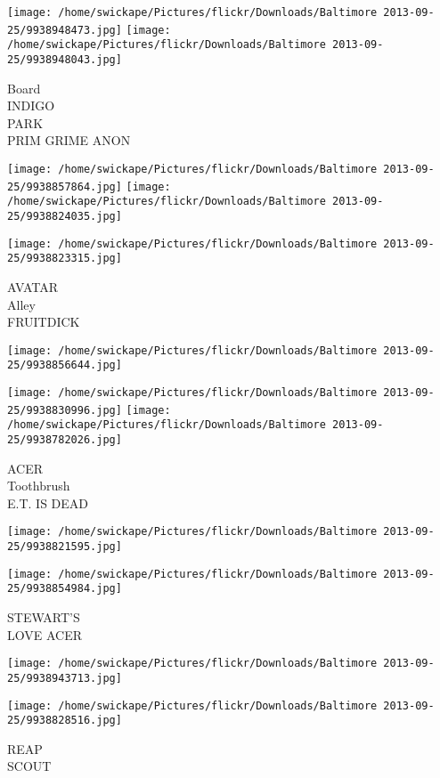 \documentclass[10pt,letterpaper]{article}
\begin{document}
\texttt{[image: /home/swickape/Pictures/flickr/Downloads/Baltimore 2013-09-25/9938948473.jpg]}
\texttt{[image: /home/swickape/Pictures/flickr/Downloads/Baltimore 2013-09-25/9938948043.jpg]}

Board\\
INDIGO\\
PARK\\
PRIM GRIME ANON
\pagebreak

\texttt{[image: /home/swickape/Pictures/flickr/Downloads/Baltimore 2013-09-25/9938857864.jpg]}
\texttt{[image: /home/swickape/Pictures/flickr/Downloads/Baltimore 2013-09-25/9938824035.jpg]}

\vspace{0.25in}
\texttt{[image: /home/swickape/Pictures/flickr/Downloads/Baltimore 2013-09-25/9938823315.jpg]}

AVATAR\\
Alley\\
FRUITDICK
\pagebreak

\texttt{[image: /home/swickape/Pictures/flickr/Downloads/Baltimore 2013-09-25/9938856644.jpg]}

\vspace{0.25in}
\texttt{[image: /home/swickape/Pictures/flickr/Downloads/Baltimore 2013-09-25/9938830996.jpg]}
\texttt{[image: /home/swickape/Pictures/flickr/Downloads/Baltimore 2013-09-25/9938782026.jpg]}

ACER\\
Toothbrush\\
E.T. IS DEAD
\pagebreak

\texttt{[image: /home/swickape/Pictures/flickr/Downloads/Baltimore 2013-09-25/9938821595.jpg]}

\vspace{0.25in}
\texttt{[image: /home/swickape/Pictures/flickr/Downloads/Baltimore 2013-09-25/9938854984.jpg]}

STEWART'S\\
LOVE ACER
\pagebreak

\texttt{[image: /home/swickape/Pictures/flickr/Downloads/Baltimore 2013-09-25/9938943713.jpg]}

\vspace{0.25in}
\texttt{[image: /home/swickape/Pictures/flickr/Downloads/Baltimore 2013-09-25/9938828516.jpg]}

REAP\\
SCOUT
\pagebreak
\end{document}
